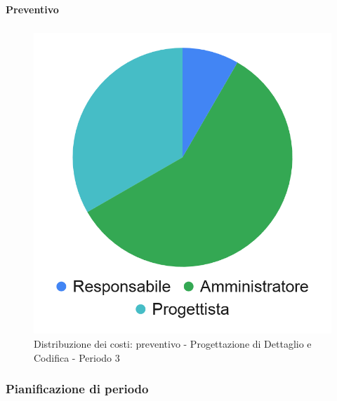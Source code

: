 \planningTable{
	
}

\paragraph{Preventivo}
\subparagraph*{}

\hspace{-1cm}
\begin{minipage}{.50\textwidth}
\smallPreventivoTable{
	
}
\end{minipage}
\hspace{1cm}
\begin{minipage}{.40\textwidth}
\begin{figure}[H]
	\includegraphics[scale=0.21]{res/images/charts/preventivo_priori/Grafico4-8.png}
	\caption{Distribuzione dei costi: preventivo - Progettazione di Dettaglio e Codifica - Periodo 3}
\end{figure}
\end{minipage} 



\subsubsection{Pianificazione di periodo}


